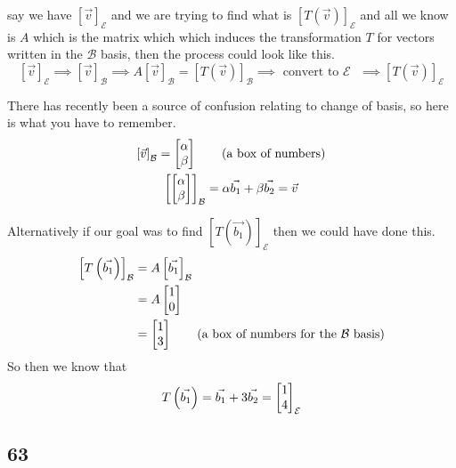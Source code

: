 \documentclass[11pt]{book}
\begin{document}
\begin{remark}
    say we have $\left[ \vec{v}  \right]_{\mathcal{E}} $ and we are trying to find what is $\left[ T\left(\vec{v} \right) \right]_{\mathcal{E}} $ and all we know is $A$ which is the matrix which which induces the transformation $T$ for vectors written in the $\mathcal{B} $ basis, then the process could look like this.
    \[
    \left[ \vec{v}  \right]_{\mathcal{E}} \implies \left[ \vec{v}  \right]_{\mathcal{B}} \implies A\left[ \vec{v}  \right]_{\mathcal{B}} =  \left[ T\left(\vec{v} \right) \right]_{\mathcal{B}} \implies \text{ convert to $\mathcal{E} $  } \implies \left[ T\left(\vec{v} \right) \right]_{\mathcal{E}} 
    \]
\end{remark}

\begin{remark}
    There has recently been a source of confusion relating to change of basis, so here is what you have to remember.
    \begin{gather*}
        \left[ \vec{v}  \right]_{\mathcal{B}} =  \begin{bmatrix} \alpha  \\ \beta  \end{bmatrix} \tag{a box of numbers}\\
        \left[ \begin{bmatrix} \alpha  \\ \beta  \end{bmatrix}  \right]_{\mathcal{B}} =  \alpha \vec{b_1}  + \beta \vec{b_2} =  \vec{v} 
    \end{gather*}
\end{remark}

\begin{eg}
    Alternatively if our goal was to find $\left[ T\left(\vec{b_1} \right) \right]_{\mathcal{E}} $ then we could have done this.
    \begin{align*}
        \left[ T\left(\vec{b_1} \right) \right]_{\mathcal{B}} &=  A\left[ \vec{b_1}  \right]_{\mathcal{B}} \\  
        &= A \mat{ 1 \\ 0 }  \\
        &= \mat{ 1 \\ 3 } \tag{a box of numbers for the $\mathcal{B}$ basis}
    \end{align*}
    So then we know that 
    \[
    T\left(\vec{b_1} \right)=  \vec{b_1}  + 3\vec{b_2} =  \begin{bmatrix} 1 \\ 4 \end{bmatrix} _{\mathcal{E} } 
    \]
\end{eg}

\subsection*{63}%
\label{sub:63}
\end{document}
